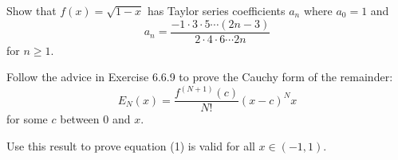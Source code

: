 \begin{exercise}
    Show that $f(x)=\sqrt{1-x}$ has Taylor series coefficients $a_{n}$ where $a_{0}=1$ and
$$
a_{n}=\frac{-1 \cdot 3 \cdot 5 \cdots(2 n-3)}{2 \cdot 4 \cdot 6 \cdots 2 n}
$$
for $n \geq 1$.
\end{exercise}
\begin{solution}
    \TODO
\end{solution}

\begin{exercise}
    \item Follow the advice in Exercise 6.6.9 to prove the Cauchy form of the remainder:
$$
E_{N}(x)=\frac{f^{(N+1)}(c)}{N !}(x-c)^{N} x
$$
for some $c$ between 0 and $x$.
\item Use this result to prove equation (1) is valid for all $x \in(-1,1)$.
\end{exercise}
\begin{solution}
    \TODO
\end{solution}

\begin{exercise}
\end{exercise}
\begin{solution}
    \TODO
\end{solution}

\begin{exercise}
\end{exercise}
\begin{solution}
    \TODO
\end{solution}


